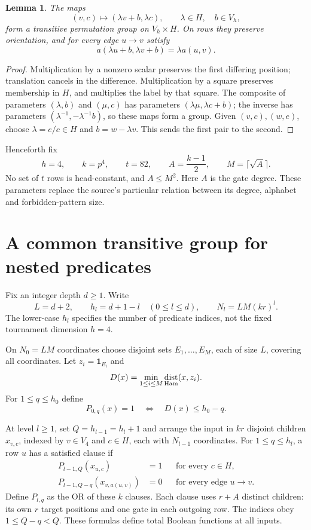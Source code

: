 \documentclass[11pt]{article}
\newtheorem{lemma}[theorem]{Lemma}
\theoremstyle{definition}
\DeclareMathOperator{\dist}{dist}
\begin{document}
\begin{lemma}\label{lem:affine}
The maps
\begin{equation}\label{eq:affine}
 (v,c)\longmapsto(\lambda v+b,\lambda c),
 \qquad \lambda\in H,\quad b\in V_h,
\end{equation}
form a transitive permutation group on $V_h\times H$. On rows they preserve orientation, and for every edge $u\to v$ satisfy
\[
 a(\lambda u+b,\lambda v+b)=\lambda a(u,v).
\]
\end{lemma}
\begin{proof}
Multiplication by a nonzero scalar preserves the first differing position; translation cancels in the difference. Multiplication by a square preserves membership in $H$, and multiplies the label by that square. The composite of parameters $(\lambda,b)$ and $(\mu,c)$ has parameters $(\lambda\mu,\lambda c+b)$; the inverse has parameters $(\lambda^{-1},-\lambda^{-1}b)$, so these maps form a group. Given $(v,c),(w,e)$, choose $\lambda=e/c\in H$ and $b=w-\lambda v$. This sends the first pair to the second.
\end{proof}

Henceforth fix
\begin{equation}\label{eq:parameters}
 h=4,\qquad k=p^4,\qquad t=82,\qquad
 A=\frac{k-1}{2},\qquad M=\lceil\sqrt A\rceil.
\end{equation}
No set of $t$ rows is head-constant, and $A\le M^2$. Here $A$ is the gate degree. These parameters replace the source's particular relation between its degree, alphabet and forbidden-pattern size.

\section{A common transitive group for nested predicates}\label{sec:predicates}
Fix an integer depth $d\ge1$. Write
\[
 L=d+2,\qquad h_l=d+1-l\quad(0\le l\le d),\qquad
 N_l=LM(kr)^l.
\]
The lower-case $h_l$ specifies the number of predicate indices, not the fixed tournament dimension $h=4$.

On $N_0=LM$ coordinates choose disjoint sets $E_1,\ldots,E_M$, each of size $L$, covering all coordinates. Let $z_i=\mathbf1_{E_i}$ and
\[
 D(x)=\min_{1\le i\le M}\dist_{\rm Ham}(x,z_i).
\]
For $1\le q\le h_0$ define
\begin{equation}\label{eq:base}
 P_{0,q}(x)=1\quad\Longleftrightarrow\quad D(x)\le h_0-q.
\end{equation}

At level $l\ge1$, set $Q=h_{l-1}=h_l+1$ and arrange the input in $kr$ disjoint children $x_{v,c}$, indexed by $v\in V_4$ and $c\in H$, each with $N_{l-1}$ coordinates. For $1\le q\le h_l$, a row $u$ has a satisfied clause if
\begin{align}
 P_{l-1,Q}(x_{u,c})&=1 &&\text{for every }c\in H,\label{eq:targets}\\
 P_{l-1,Q-q}(x_{v,a(u,v)})&=0 &&\text{for every edge }u\to v.\label{eq:gates}
\end{align}
Define $P_{l,q}$ as the OR of these $k$ clauses. Each clause uses $r+A$ distinct children: its own $r$ target positions and one gate in each outgoing row. The indices obey $1\le Q-q<Q$. These formulas define total Boolean functions at all inputs.
\end{document}
